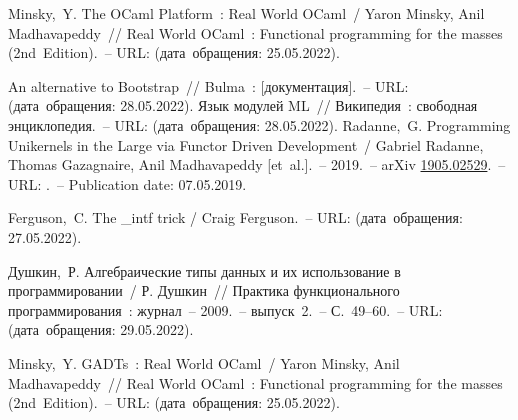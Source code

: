 \begin{thebibliography}{00}
      Minsky,~Y. The OCaml Platform~: Real World OCaml~/
      Yaron Minsky, Anil Madhavapeddy~//
      Real World OCaml~: Functional programming for the masses (2nd~Edition).~--
      URL: \underline{} (дата~обращения: 25.05.2022).
      
      An alternative to Bootstrap~// Bulma~: [документация].~--
      URL: \underline{}
      (дата~обращения: 28.05.2022). 
      Язык модулей ML~// Википедия~: свободная энциклопедия.~--
      URL: \underline{}
      (дата~обращения: 28.05.2022). 
    Radanne,~G. Programming Unikernels in the Large via Functor Driven Development~/ Gabriel Radanne, Thomas Gazagnaire, Anil Madhavapeddy [et~al.].~--
    2019.~--
    arXiv \href{https://arxiv.org/abs/1905.02529}{1905.02529}.~--
    URL: \underline{}.~--
    Publication date: 07.05.2019.
    
    Ferguson,~C. The \_intf trick / Craig Ferguson.~--
            URL: \underline{}
            (дата~обращения: 27.05.2022).
    
      Душкин,~Р. Алгебраические типы данных и их использование в программировании~/
      Р. Душкин~// Практика функционального программирования~: журнал~--
      2009.~--
      выпуск~2.~--
      С.~49--60.~--
      URL: \underline{}
      (дата~обращения: 29.05.2022).
      
      Minsky,~Y. GADTs~: Real World OCaml~/
      Yaron Minsky, Anil Madhavapeddy~//
      Real World OCaml~: Functional programming for the masses (2nd~Edition).~--
      URL: \underline{} (дата~обращения: 25.05.2022).
      

\end{thebibliography}
